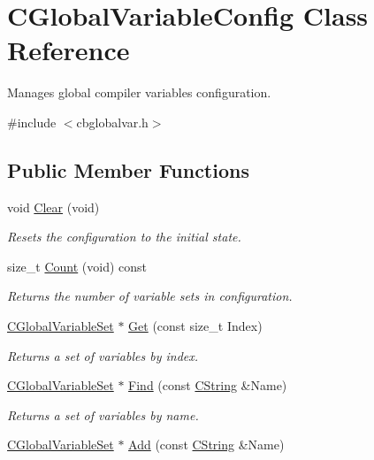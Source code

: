 \hypertarget{classCGlobalVariableConfig}{\section{C\-Global\-Variable\-Config Class Reference}
\label{classCGlobalVariableConfig}
}


Manages global compiler variables configuration.  




{\ttfamily \#include $<$cbglobalvar.\-h$>$}

\subsection*{Public Member Functions}
\begin{DoxyCompactItemize}
\item 
void \hyperlink{classCGlobalVariableConfig_a025623c448640d52acf1e54b2d5ea351}{Clear} (void)
\begin{DoxyCompactList}\small\item\em Resets the configuration to the initial state. \end{DoxyCompactList}\item 
size\-\_\-t \hyperlink{classCGlobalVariableConfig_a825f60c73564353fa46bea8a5db44a81}{Count} (void) const 
\begin{DoxyCompactList}\small\item\em Returns the number of variable sets in configuration. \end{DoxyCompactList}\item 
\hyperlink{classCGlobalVariableSet}{C\-Global\-Variable\-Set} $\ast$ \hyperlink{classCGlobalVariableConfig_a19cdea45eda20720b16ea953de9b4f96}{Get} (const size\-\_\-t Index)
\begin{DoxyCompactList}\small\item\em Returns a set of variables by index. \end{DoxyCompactList}\item 
\hyperlink{classCGlobalVariableSet}{C\-Global\-Variable\-Set} $\ast$ \hyperlink{classCGlobalVariableConfig_a7f25689ffb6f29407d5036284eb2d3b2}{Find} (const \hyperlink{classCString}{C\-String} \&Name)
\begin{DoxyCompactList}\small\item\em Returns a set of variables by name. \end{DoxyCompactList}\item 
\hyperlink{classCGlobalVariableSet}{C\-Global\-Variable\-Set} $\ast$ \hyperlink{classCGlobalVariableConfig_a19cb59443e659ede0e870a156519c1eb}{Add} (const \hyperlink{classCString}{C\-String} \&Name)

\end{DoxyCompactItemize}

